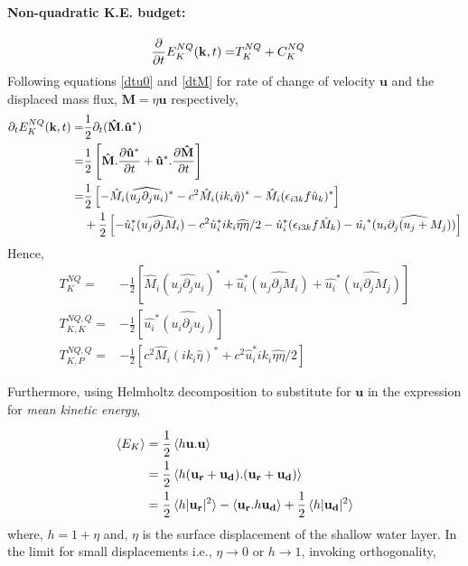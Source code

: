\paragraph{Non-quadratic K.E. budget:}
\begin{align*}
  \pder{t}E_K^{NQ}(\mathbf{k},t) =& T_K^{NQ} + C_K^{NQ}
\end{align*}
Following equations \eqref{dtu0} and \eqref{dtM} for rate of change of velocity 
$\mathbf{u}$ and the displaced mass flux, $\mathbf M = \eta \mathbf{u}$ 
respectively,
 \begin{align*}
 \partial_t E_K^{NQ}(\mathbf{k},t)
 =& \frac{1}{2}\partial_t(\mathbf{\hat M}.\mathbf{\hat u^*})\\
 =& \frac{1}{2}\left[ \mathbf{\hat M} .\pder[\mathbf{\hat u^*}]{t} 
		      + \mathbf{\hat u^*}. \pder[\mathbf{\hat M}]{t}\right]\\
 =& \frac{1}{2}\left[-\hat{M}_i(\widehat{ u_j\partial_j u_i })^*
		      - c^2 \hat{M}_i (ik_i \hat{\eta})^*
		      - \hat{M}_i (\epsilon_{i3k} f \hat{u}_k)^* \right]\\
  &+\frac{1}{2}\left[ - \hat{u}_i^* \widehat{(u_j\partial_j M_i) }
		      - c^2\hat{u}_i^*ik_i\widehat{\eta\eta}/2
		      - \hat{u}_i^* (\epsilon_{i3k} f \hat{M}_k) 
		      - \hat{u_i}^* \widehat{(u_i \partial_j({u}_j+ 
M_j))}
			\right]
\end{align*}
Hence,
\begin{align}
 T_K^{NQ}= & -\frac{1}{2}\left[\hat{M}_i(\widehat{ u_j\partial_j u_i })^*
			      + \hat{u}_i^* \widehat{(u_j\partial_j M_i) }
			      + \hat{u_i}^* \widehat{(u_i \partial_j{M}_j)}
			      \right] \\
 T_{K,K}^{NQ,Q}= & -\frac{1}{2}\left[ \hat{u_i}^* \widehat{(u_i 
\partial_j{u}_j)}
			\right] \\
 T_{K,P}^{NQ,Q}= & -\frac{1}{2}\left[c^2 \hat{M}_i (ik_i \hat{\eta})^*
	      + c^2\hat{u}_i^*ik_i\widehat{\eta\eta} /2
	      \right]
\end{align}


Furthermore, using Helmholtz decomposition to substitute for $\mathbf u$ in  
the expression 
for \emph{mean kinetic energy},

\begin{align}
\braket{ E_K} 
& = \frac{1}{2} \braket{ h\mathbf u.\mathbf u} \\
& = \frac{1}{2} \braket{h(\mathbf{u_r} + \mathbf{u_d} ).(\mathbf{u_r} + 
\mathbf{u_d} )}\\
& = \frac{1}{2}\braket{ h |\mathbf{u_r} | ^2} 
    -\braket{ \mathbf{u_r}.h\mathbf{u_d}}
    +  \frac{1}{2} \braket{ h | \mathbf{u_d}| ^2}
\end{align}
where, $h = 1 + \eta$ and, $\eta$ is the surface displacement of the shallow 
water layer. In the limit for small displacements i.e., $\eta \to 0$ or $ h \to 
1$, invoking orthogonality,


